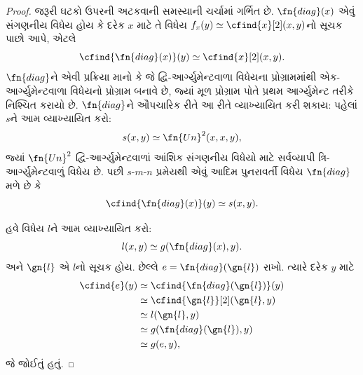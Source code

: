\documentclass[../../../include/open-logic-section]{subfiles}
\begin{document}
\begin{proof}
જરૂરી ઘટકો ઉપરની અટકવાની સમસ્યાની ચર્ચામાં ગર્ભિત છે.
$\fn{diag}(x)$ એવું સંગણનીય વિધેય હોય કે દરેક $x$ માટે
તે વિધેય $f_x(y) \simeq \cfind{x}[2](x,y)$નો સૂચક
પાછો આપે, એટલે
\[
\cfind{\fn{diag}(x)}(y) \simeq \cfind{x}[2](x,y).
\]
$\fn{diag}$ને એવી પ્રક્રિયા માનો કે જે દ્વિ-આર્ગ્યુમેન્ટવાળા
વિધેયના પ્રોગ્રામમાંથી એક-આર્ગ્યુમેન્ટવાળા વિધેયનો પ્રોગ્રામ
બનાવે છે, જ્યાં મૂળ પ્રોગ્રામ પોતે પ્રથમ આર્ગ્યુમેન્ટ તરીકે
નિશ્ચિત કરાયો છે. $\fn{diag}$ને ઔપચારિક રીતે આ રીતે
વ્યાખ્યાયિત કરી શકાય: પહેલાં $s$ને આમ વ્યાખ્યાયિત કરો:
\[
s(x,y) \simeq \fn{Un}^2(x,x,y),
\]
જ્યાં $\fn{Un}^2$ દ્વિ-આર્ગ્યુમેન્ટવાળાં આંશિક સંગણનીય
વિધેયો માટે સર્વવ્યાપી ત્રિ-આર્ગ્યુમેન્ટવાળું વિધેય છે.
પછી $s$-$m$-$n$ પ્રમેયથી એવું આદિમ પુનરાવર્તી વિધેય
$\fn{diag}$ મળે છે કે
\[
\cfind{\fn{diag}(x)}(y) \simeq s(x,y).
\]

હવે વિધેય $l$ને આમ વ્યાખ્યાયિત કરો:
\[
l(x,y) \simeq g(\fn{diag}(x),y).
\]
અને $\gn{l}$ એ $l$નો સૂચક હોય. છેલ્લે
$e = \fn{diag}(\gn{l})$ રાખો. ત્યારે દરેક $y$ માટે
\begin{align*}
\cfind{e}(y) & \simeq \cfind{\fn{diag}(\gn{l})}(y) \\
& \simeq \cfind{\gn{l}}[2](\gn{l}, y) \\
& \simeq l(\gn{l}, y) \\
& \simeq g(\fn{diag}(\gn{l}),y) \\
& \simeq g(e, y),
\end{align*}
જે જોઈતું હતું.
\end{proof}
\end{document}
